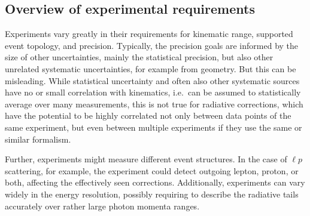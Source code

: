 \subsection{Overview of experimental requirements}

Experiments vary greatly in their requirements for kinematic range, supported event topology, and precision. Typically, the precision goals are informed by the size of other uncertainties, mainly the statistical precision, but also other unrelated systematic uncertainties, for example from geometry. But this can be misleading. While statistical uncertainty and often also other systematic sources have no or small correlation with kinematics, i.e.\ can be assumed to statistically average over many measurements, this is not true for radiative corrections, which have the potential to be highly correlated not only between data points of the same experiment, but even between multiple experiments if they use the same or similar formalism. 

Further, experiments might measure different event structures. In the case of $\ell p$ scattering, for example, the experiment could detect outgoing lepton, proton, or both, affecting the effectively seen corrections. Additionally, experiments can vary widely in the energy resolution, possibly requiring to describe the radiative tails accurately over rather large photon momenta ranges.  


